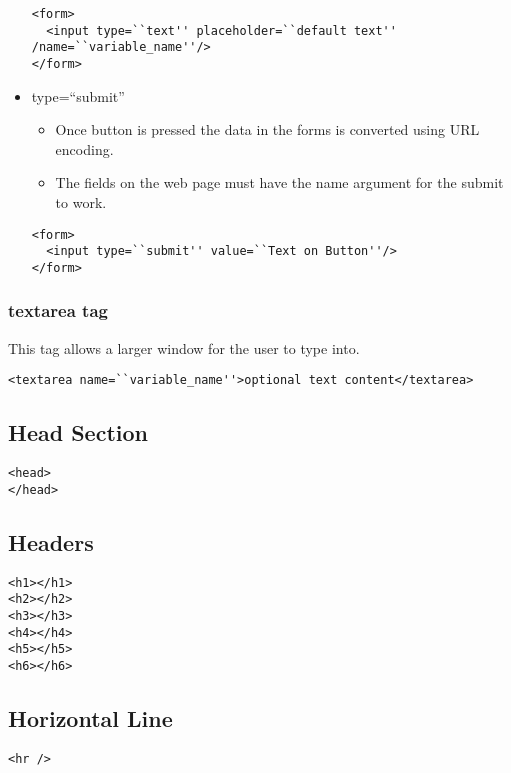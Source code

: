 \documentclass{article}
\begin{document}
\begin{itemize}
\begin{lstlisting}
<form>
  <input type=``text'' placeholder=``default text'' /name=``variable_name''/>
</form>
\end{lstlisting}

  \item type=``submit''
    \begin{itemize}
      \item Once button is pressed the data in the forms is converted using
            URL encoding.
      \item The fields on the web page must have the name argument for the
            submit to work.
    \end{itemize}
\begin{lstlisting}
<form>
  <input type=``submit'' value=``Text on Button''/>
</form>
\end{lstlisting}


\end{itemize}

\subsubsection{textarea tag}
This tag allows a larger window for the user to type into.

\begin{lstlisting}
<textarea name=``variable_name''>optional text content</textarea>
\end{lstlisting}

\subsection{Head Section}
\begin{lstlisting}
<head>
</head>
\end{lstlisting}

\subsection{Headers}
\begin{lstlisting}
<h1></h1>
<h2></h2>
<h3></h3>
<h4></h4>
<h5></h5>
<h6></h6>
\end{lstlisting}

\subsection{Horizontal Line}
\begin{lstlisting}
<hr />
\end{lstlisting}
\end{document}
